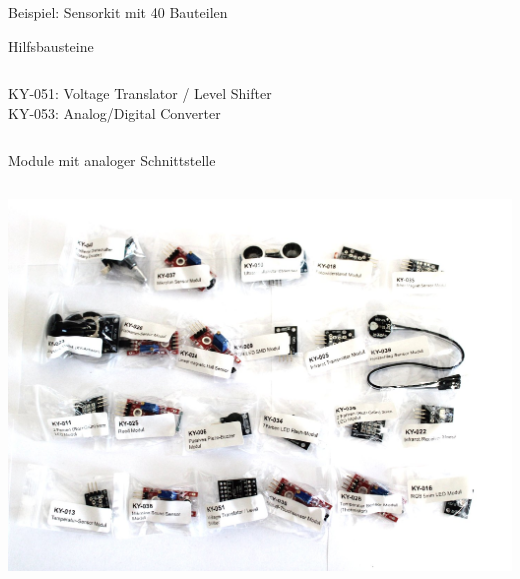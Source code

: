 {\begin{frame}[allowframebreaks]{Beispiel: Sensorkit mit 40 Bauteilen}
    \begin{block}{Hilfsbausteine}
        \medskip
        \begin{columns}
            KY-051: Voltage Translator / Level Shifter \\

            KY-053: Analog/Digital Converter \\
        \end{columns}
    \end{block}
\end{frame}
}

{
\scriptsize

\begin{frame}{Module mit analoger Schnittstelle}
    \begin{columns}
        \includegraphics[width=\textwidth]{2-hardwaredesign/img/sensorkit_analog}


\end{columns}
\end{frame}}
